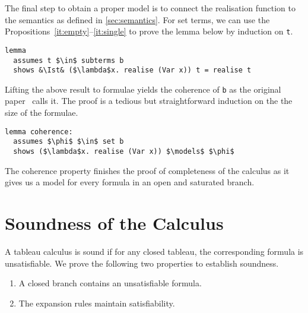\documentclass[sigplan,10pt,anonymous,review]{acmart}
\newcommand{\Ist}{I$_\text{st}$}
\begin{document}
\noindent The final step to obtain a proper model is to connect the realisation function to the semantics as defined in \autoref{sec:semantics}.
For set terms, we can use the Propositions~\ref{it:empty}--\ref{it:single} to prove the lemma below by induction on \lstinline!t!.
\begin{lstlisting}
lemma
  assumes t $\in$ subterms b
  shows &\Ist& ($\lambda$x. realise (Var x)) t = realise t
\end{lstlisting}
Lifting the above result to formulae yields the coherence of \lstinline!b! as the original paper~\cite{new_fast_tableau} calls it.
The proof is a tedious but straightforward induction on the the size of the formulae.
\begin{lstlisting}[label={lst:coherence}]
lemma coherence:
  assumes $\phi$ $\in$ set b
  shows ($\lambda$x. realise (Var x)) $\models$ $\phi$
\end{lstlisting}
The coherence property finishes the proof of completeness of the calculus as it gives us a model for every formula in an open and saturated branch.

\section{Soundness of the Calculus\label{sec:sound}}
A tableau calculus is sound if for any closed tableau, the corresponding formula is unsatisfiable. 
We prove the following two properties to establish soundness.
\begin{enumerate}[label={(\roman*)}]
  \item A closed branch contains an unsatisfiable formula.
  \item The expansion rules maintain satisfiability.
\end{enumerate}
\end{document}
